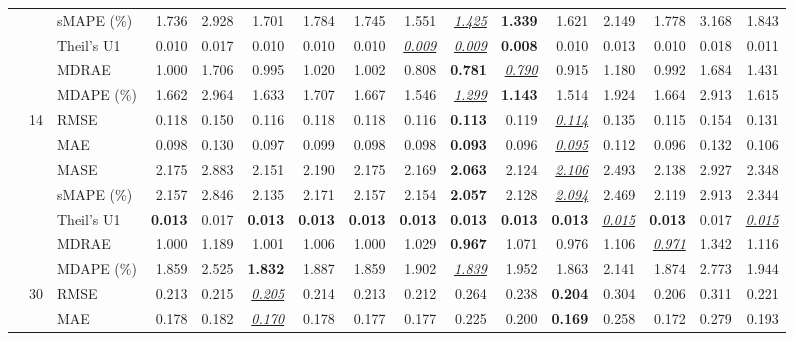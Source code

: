 \begin{table}[!htbp]
{\begin{tabular}{lllrrrrrrrrrrrrr}
 &  & sMAPE (\%) & 1.736 & 2.928 & 1.701 & 1.784 & 1.745 & 1.551 & \underline{\textit{1.425}} & \textbf{1.339} & 1.621 & 2.149 & 1.778 & 3.168 & 1.843 \\
 &  & Theil's U1 & 0.010 & 0.017 & 0.010 & 0.010 & 0.010 & \underline{\textit{0.009}} & \underline{\textit{0.009}} & \textbf{0.008} & 0.010 & 0.013 & 0.010 & 0.018 & 0.011 \\
 &  & MDRAE & 1.000 & 1.706 & 0.995 & 1.020 & 1.002 & 0.808 & \textbf{0.781} & \underline{\textit{0.790}} & 0.915 & 1.180 & 0.992 & 1.684 & 1.431 \\
 &  & MDAPE (\%) & 1.662 & 2.964 & 1.633 & 1.707 & 1.667 & 1.546 & \underline{\textit{1.299}} & \textbf{1.143} & 1.514 & 1.924 & 1.664 & 2.913 & 1.615 \\
\cmidrule(lr){2-16}
 & 14 & RMSE & 0.118 & 0.150 & 0.116 & 0.118 & 0.118 & 0.116 & \textbf{0.113} & 0.119 & \underline{\textit{0.114}} & 0.135 & 0.115 & 0.154 & 0.131 \\
 &  & MAE & 0.098 & 0.130 & 0.097 & 0.099 & 0.098 & 0.098 & \textbf{0.093} & 0.096 & \underline{\textit{0.095}} & 0.112 & 0.096 & 0.132 & 0.106 \\
 &  & MASE & 2.175 & 2.883 & 2.151 & 2.190 & 2.175 & 2.169 & \textbf{2.063} & 2.124 & \underline{\textit{2.106}} & 2.493 & 2.138 & 2.927 & 2.348 \\
 &  & sMAPE (\%) & 2.157 & 2.846 & 2.135 & 2.171 & 2.157 & 2.154 & \textbf{2.057} & 2.128 & \underline{\textit{2.094}} & 2.469 & 2.119 & 2.913 & 2.344 \\
 &  & Theil's U1 & \textbf{0.013} & 0.017 & \textbf{0.013} & \textbf{0.013} & \textbf{0.013} & \textbf{0.013} & \textbf{0.013} & \textbf{0.013} & \textbf{0.013} & \underline{\textit{0.015}} & \textbf{0.013} & 0.017 & \underline{\textit{0.015}} \\
 &  & MDRAE & 1.000 & 1.189 & 1.001 & 1.006 & 1.000 & 1.029 & \textbf{0.967} & 1.071 & 0.976 & 1.106 & \underline{\textit{0.971}} & 1.342 & 1.116 \\
 &  & MDAPE (\%) & 1.859 & 2.525 & \textbf{1.832} & 1.887 & 1.859 & 1.902 & \underline{\textit{1.839}} & 1.952 & 1.863 & 2.141 & 1.874 & 2.773 & 1.944 \\
\cmidrule(lr){2-16}
 & 30 & RMSE & 0.213 & 0.215 & \underline{\textit{0.205}} & 0.214 & 0.213 & 0.212 & 0.264 & 0.238 & \textbf{0.204} & 0.304 & 0.206 & 0.311 & 0.221 \\
 &  & MAE & 0.178 & 0.182 & \underline{\textit{0.170}} & 0.178 & 0.177 & 0.177 & 0.225 & 0.200 & \textbf{0.169} & 0.258 & 0.172 & 0.279 & 0.193 \\

\end{tabular}}
\end{table}
